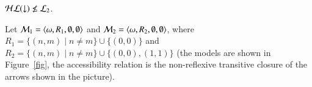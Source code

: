 \begin{thm} \label{thm:tle_not_equal_hlogic}
$\mathcal{HL}({\downarrow})\not\leq\mathcal{L}_2$.
\end{thm}

\begin{pf}
Let $\mathcal{M}_1=\langle \omega,R_1,\emptyset,\emptyset \rangle$ and
$\mathcal{M}_2=\langle \omega,R_2,\emptyset,\emptyset \rangle$, where $R_1=\{(n,m)
\mid n\not= m\} \cup \{(0,0)\}$ and $R_2=\{(n,m) \mid n\not= m\}
\cup \{(0,0),(1,1)\}$ (the models are shown in Figure~\ref{fig}, the
accessibility relation is the non-reflexive transitive closure of the arrows shown
in the picture).

%
%
%
%
%
%
%
%


\end{pf}
